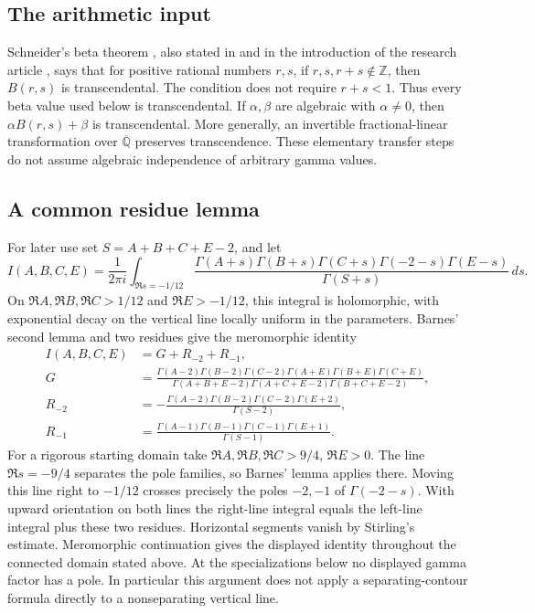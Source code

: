 \documentclass[11pt,a4paper]{article}
\theoremstyle{definition}
\theoremstyle{remark}
\numberwithin{equation}{section}
\newcommand{\Qbar}{\overline{\mathbb Q}}
\begin{document}
\subsection{The arithmetic input}
Schneider's beta theorem \cite{extra8-schneider}, also stated in
\cite[Theorem~12]{extra8-waldschmidt} and in the introduction of the research
article \cite{extra8-dhillon-saha}, says that for positive rational numbers
\(r,s\), if \(r,s,r+s\notin\mathbb Z\), then \(B(r,s)\) is
transcendental. The condition does not require \(r+s<1\).
Thus every beta value used below is transcendental.
If \(\alpha,\beta\) are algebraic with \(\alpha\ne0\), then
\(\alpha B(r,s)+\beta\) is transcendental. More generally, an invertible
fractional-linear transformation over \(\Qbar\) preserves transcendence.
These elementary transfer steps do not assume algebraic independence of
arbitrary gamma values.

\subsection{A common residue lemma}
\label{extra8-sec:residue}
For later use set \(S=A+B+C+E-2\), and let
\[
I(A,B,C,E)=\frac1{2\pi i}\int_{\Re s=-1/12}
\frac{\Gamma(A+s)\Gamma(B+s)\Gamma(C+s)
      \Gamma(-2-s)\Gamma(E-s)}{\Gamma(S+s)}\,ds.
\]
On \(\Re A,\Re B,\Re C>1/12\) and \(\Re E>-1/12\), this integral
is holomorphic, with exponential decay on the vertical line locally
uniform in the parameters. Barnes' second lemma \cite[Eq.~(5.6)]{extra8-barnes}
and two residues give the meromorphic identity
\begin{align*}
I(A,B,C,E)&=G+R_{-2}+R_{-1},\\
G&=\frac{\Gamma(A-2)\Gamma(B-2)\Gamma(C-2)
\Gamma(A+E)\Gamma(B+E)\Gamma(C+E)}
{\Gamma(A+B+E-2)\Gamma(A+C+E-2)\Gamma(B+C+E-2)},\\
R_{-2}&=-\frac{\Gamma(A-2)\Gamma(B-2)\Gamma(C-2)\Gamma(E+2)}
{\Gamma(S-2)},\\
R_{-1}&=\frac{\Gamma(A-1)\Gamma(B-1)\Gamma(C-1)\Gamma(E+1)}
{\Gamma(S-1)}.
\end{align*}
For a rigorous starting domain take \(\Re A,\Re B,\Re C>9/4\),
\(\Re E>0\). The line \(\Re s=-9/4\) separates the pole families,
so Barnes' lemma applies there. Moving this line right to \(-1/12\)
crosses precisely the poles \(-2,-1\) of \(\Gamma(-2-s)\).
With upward orientation on both lines the right-line integral equals
the left-line integral plus these two residues. Horizontal segments
vanish by Stirling's estimate. Meromorphic continuation gives the
displayed identity throughout the connected domain stated above.
At the specializations below no displayed gamma factor has a pole.
In particular this argument does not apply a separating-contour formula
directly to a nonseparating vertical line.
\end{document}
